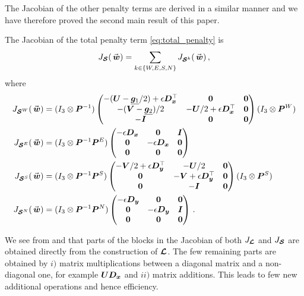 The Jacobian of the other penalty terms are derived in a similar manner and we have therefore proved the second main result of this paper.

\begin{proposition}
The Jacobian of the total penalty term \eqref{eq:total_penalty} is
\begin{equation}
  J_{\satn} (\wn) = \sum_{k\in\{W,E,S,N\}} J_{\satn^k}(\wn)
  \, ,
  \label{eq:jacobian_penalty}
\end{equation}
where 
\begin{equation*}
\begin{aligned}
   J_{\satn^W}(\wn) & = (I_3\otimes \Pn^{-1})
  \begin{pmatrix}
   -(\Un-\diagn{\gn_1}/2) + \epsilon \Dx^\top & \zeron & \zeron
   \\
   -(\Vn-\diagn{\gn_2})/2 & -\Un/2 + \epsilon \Dx^\top & \zeron 
   \\
   -\In & \zeron & \zeron
  \end{pmatrix}
  (I_3\otimes \Pn^W)
  \\
  J_{\satn^E}(\wn) & = (I_3\otimes \Pn^{-1}\Pn^E) 
  \begin{pmatrix}
   - \epsilon \Dx & \zeron & \In
   \\
   \zeron & - \epsilon \Dx & \zeron 
   \\
   \zeron & \zeron & \zeron
  \end{pmatrix}
  \\
  J_{\satn^S}(\wn) & = (I_3\otimes \Pn^{-1}\Pn^S) 
  \begin{pmatrix}
   -\Vn/2 + \epsilon \Dy^\top& -\Un/2 & \zeron
   \\
   \zeron & -\Vn + \epsilon \Dy^\top & \zeron 
   \\
   \zeron & -\In & \zeron
  \end{pmatrix}
  (I_3\otimes \Pn^S)
  \\
  J_{\satn^N}(\wn) & = (I_3\otimes \Pn^{-1}\Pn^N)
  \begin{pmatrix}
   - \epsilon \Dy & \zeron & \zeron
   \\
   \zeron & - \epsilon \Dy & \In
   \\
   \zeron & \zeron & \zeron
  \end{pmatrix}
   \, .
\end{aligned}
\end{equation*}
\label{prop:sat}
\end{proposition}

\begin{remark}
We see from  and  that parts of the blocks in the Jacobian of both $J_{\bm{\mathcal{L}}}$ and $J_{\bm{\mathcal{S}}}$ are obtained directly from the construction of $\bm{\mathcal{L}}$. The few remaining parts are obtained by $i)$ matrix multiplications between a diagonal matrix and a non-diagonal one,
 for example $\bm{U} \bm{D_x}$ and $ii)$ matrix additions. This leads to few new additional operations and hence efficiency.
\end{remark}
